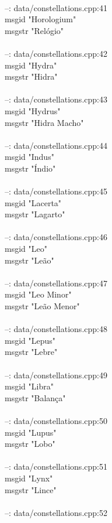 \documentclass[10pt]{article}
\begin{document}
\\
--: data/constellations.cpp:41\\
msgid "Horologium"\\
msgstr "Relógio"\\
\\
--: data/constellations.cpp:42\\
msgid "Hydra"\\
msgstr "Hidra"\\
\\
--: data/constellations.cpp:43\\
msgid "Hydrus"\\
msgstr "Hidra Macho"\\
\\
--: data/constellations.cpp:44\\
msgid "Indus"\\
msgstr "Índio"\\
\\
--: data/constellations.cpp:45\\
msgid "Lacerta"\\
msgstr "Lagarto"\\
\\
--: data/constellations.cpp:46\\
msgid "Leo"\\
msgstr "Leão"\\
\\
--: data/constellations.cpp:47\\
msgid "Leo Minor"\\
msgstr "Leão Menor"\\
\\
--: data/constellations.cpp:48\\
msgid "Lepus"\\
msgstr "Lebre"\\
\\
--: data/constellations.cpp:49\\
msgid "Libra"\\
msgstr "Balança"\\
\\
--: data/constellations.cpp:50\\
msgid "Lupus"\\
msgstr "Lobo"\\
\\
--: data/constellations.cpp:51\\
msgid "Lynx"\\
msgstr "Lince"\\
\\
--: data/constellations.cpp:52\\
\end{document}
